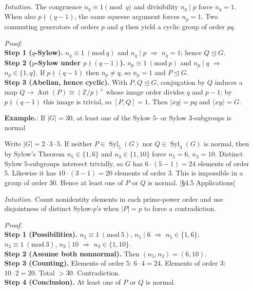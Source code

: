 \documentclass[12pt]{article}
\theoremstyle{definition}
\newcommand{\Aut}{\operatorname{Aut}}
\newcommand{\Syl}{\operatorname{Syl}}
\begin{document}
\dotfill

\emph{Intuition.} The congruence $n_q\equiv1\pmod q$ and divisibility $n_q\mid p$ force $n_q=1$. When also $p\nmid(q-1)$, the same squeeze argument forces $n_p=1$. Two commuting generators of orders $p$ and $q$ then yield a cyclic group of order $pq$. 

\dotfill

\emph{Proof.}\\
\textbf{Step 1 ($q$-Sylow).} $n_q\equiv1\ (\mathrm{mod}\ q)$ and $n_q\mid p$ $\Rightarrow$ $n_q=1$; hence $Q\trianglelefteq G$.\\
\textbf{Step 2 ($p$-Sylow under $p\nmid(q-1)$).} $n_p\equiv1\ (\mathrm{mod}\ p)$ and $n_p\mid q$ $\Rightarrow$ $n_p\in\{1,q\}$. If $p\nmid(q-1)$ then $n_p\ne q$, so $n_p=1$ and $P\trianglelefteq G$.\\
\textbf{Step 3 (Abelian, hence cyclic).} With $P,Q\trianglelefteq G$, conjugation by $Q$ induces a map $Q\to\Aut(P)\cong(\mathbb{Z}/p)^\times$ whose image order divides $q$ and $p-1$; by $p\nmid(q-1)$ this image is trivial, so $[P,Q]=1$. Then $|xy|=pq$ and $\langle xy\rangle=G$.\\

\newpage


\noindent\textbf{Example.}: If $|G|=30$, at least one of the Sylow $5$- or Sylow $3$-subgroups is normal

\newpage

Write $|G|=2\cdot3\cdot5$. If neither $P\in\Syl_5(G)$ nor $Q\in\Syl_3(G)$ is normal, then by Sylow’s Theorem $n_5\in\{1,6\}$ and $n_3\in\{1,10\}$ force $n_5=6$, $n_3=10$. Distinct Sylow $5$-subgroups intersect trivially, so $G$ has $6\cdot(5-1)=24$ elements of order $5$. Likewise it has $10\cdot(3-1)=20$ elements of order $3$. This is impossible in a group of order $30$. Hence at least one of $P$ or $Q$ is normal. \hfill {\footnotesize [§4.5 Applications]}\\

\dotfill

\emph{Intuition.} Count nonidentity elements in each prime-power order and use disjointness of distinct Sylow-$p$’s when $|P|=p$ to force a contradiction.

\dotfill

\emph{Proof.}\\
\textbf{Step 1 (Possibilities).} $n_5\equiv1\ (\mathrm{mod}\ 5)$, $n_5\mid 6$ $\Rightarrow$ $n_5\in\{1,6\}$; $n_3\equiv1\ (\mathrm{mod}\ 3)$, $n_3\mid 10$ $\Rightarrow$ $n_3\in\{1,10\}$.\\
\textbf{Step 2 (Assume both nonnormal).} Then $(n_5,n_3)=(6,10)$.\\
\textbf{Step 3 (Counting).} Elements of order $5$: $6\cdot4=24$. Elements of order $3$: $10\cdot2=20$. Total $>30$. Contradiction.\\
\textbf{Step 4 (Conclusion).} At least one of $P$ or $Q$ is normal.\\
\end{document}
